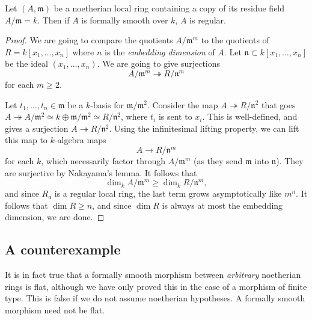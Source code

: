 \begin{theorem} 
Let $(A, \mathfrak{m})$ be a noetherian local ring containing a copy of its
residue field $A/\mathfrak{m}= k$. Then if $A$ is formally smooth over $k$, $A$
is regular.
\end{theorem} 
\begin{proof} 
We are going to compare the quotients $A/\mathfrak{m}^m$ to the quotients of
$R= k[x_1, \dots, x_n]$ where  $n$ is the \emph{embedding dimension} of
$A$.
Let $\mathfrak{n} \subset k[x_1, \dots, x_n]$ be the ideal $(x_1, \dots, x_n)$. 
We are going to give surjections
\[ A/\mathfrak{m}^m \twoheadrightarrow R/\mathfrak{n}^m  \]
for each $m \geq 2$.

Let $t_1, \dots, t_n \in \mathfrak{m}$ be a $k$-basis for
$\mathfrak{m}/\mathfrak{m}^2$.
Consider the map $A \twoheadrightarrow R/\mathfrak{n}^2 $ that goes
$A  \twoheadrightarrow A/\mathfrak{m}^2 \simeq  k \oplus
\mathfrak{m}/\mathfrak{m}^2 \simeq R/\mathfrak{n}^2$, where $t_i$ is sent to
$x_i$. This is well-defined, and gives a surjection $A \twoheadrightarrow
R/\mathfrak{n}^2$.
Using the infinitesimal lifting property, we can lift this map to
$k$-algebra maps
\[ A \to R/\mathfrak{n}^m  \]
for each $k$, which necessarily factor through $A/\mathfrak{m}^m$ (as they send
$\mathfrak{m}$ into $\mathfrak{n}$). They are surjective by Nakayama's lemma.
It follows that
\[ \dim_k A/\mathfrak{m}^m \geq \dim_k R/\mathfrak{n}^m,  \]
and since $R_{\mathfrak{n}}$ is a regular local ring, the last term grows
asymptotically like $m^n$. It follows that $\dim R \geq n$, and since $\dim R$
is always at most the embedding dimension, we are done.
\end{proof} 


\subsection{A counterexample}

It is in fact true that a formally smooth morphism between \emph{arbitrary} noetherian rings is
flat, although we have only proved this in the case of a morphism of finite
type.
This is false if we do not assume noetherian hypotheses.
A formally smooth morphism need not be flat.

